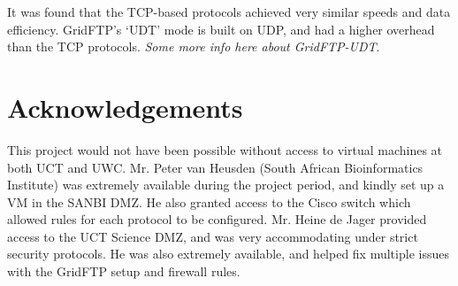 \documentclass{sig-alternate-05-2015}
\begin{document}
It was found that the TCP-based protocols achieved very similar speeds and data efficiency. GridFTP's `UDT' mode is built on UDP, and had a higher overhead than the TCP protocols. \textit{Some more info here about GridFTP-UDT}.

\section{Acknowledgements}
This project would not have been possible without access to virtual machines at both UCT and UWC. Mr. Peter van Heusden (South African Bioinformatics Institute) was extremely available during the project period, and kindly set up a VM in the SANBI DMZ. He also granted access to the Cisco switch which allowed rules for each protocol to be configured. Mr. Heine de Jager provided access to the UCT Science DMZ, and was very accommodating under strict security protocols. He was also extremely available, and helped fix multiple issues with the GridFTP setup and firewall rules.



\end{document}
